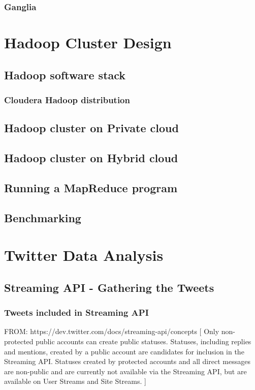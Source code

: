 \documentclass[12pt,a4paper]{report}
\begin{document}
\subsection{Ganglia}

\chapter{Hadoop Cluster Design}

\section{Hadoop software stack}
\subsection{Cloudera Hadoop distribution}
\section{Hadoop cluster on Private cloud}
\section{Hadoop cluster on Hybrid cloud}
\section{Running a MapReduce program}
\section{Benchmarking}


\chapter{Twitter Data Analysis}

\section{Streaming API - Gathering the Tweets}

\subsection{Tweets included in Streaming API}

FROM: https://dev.twitter.com/docs/streaming-api/concepts
[
Only non-protected public accounts can create public statuses. 
Statuses, including replies and mentions, created by a public 
account are candidates for inclusion in the Streaming API. Statuses 
created by protected accounts and all direct messages are non-public 
and are currently not available via the Streaming API, but are 
available on User Streams and Site Streams.
]
\end{document}
